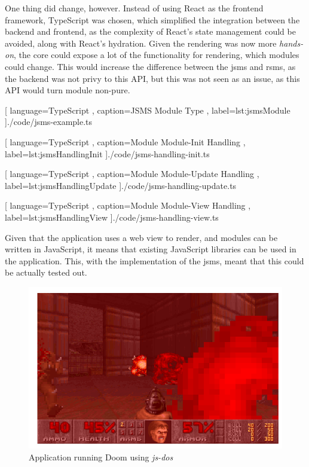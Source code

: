 One thing did change, however. Instead of using React as the frontend framework,
TypeScript was chosen, which simplified the integration between the backend and
frontend, as the complexity of React's state management could be avoided, along
with React's hydration. Given the rendering was now more \textit{hands-on}, the
core could expose a lot of the functionality for rendering, which modules could
change. This would increase the difference between the \gls{jsms} and
\gls{rsms}, as the backend was not privy to this API, but this was not seen as
an issue, as this API would turn module non-pure.

\begin{center}
  
    [ language=TypeScript
    , caption={JSMS Module Type}
    , label=lst:jsmsModule
    ]{./code/jsms-example.ts}
\end{center}

\begin{center}
  
    [ language=TypeScript
    , caption={Module Module-Init Handling}
    , label=lst:jsmsHandlingInit
    ]{./code/jsms-handling-init.ts}
\end{center}

\begin{center}
  
    [ language=TypeScript
    , caption={Module Module-Update Handling}
    , label=lst:jsmsHandlingUpdate
    ]{./code/jsms-handling-update.ts}
\end{center}

\begin{center}
  
    [ language=TypeScript
    , caption={Module Module-View Handling}
    , label=lst:jsmsHandlingView
    ]{./code/jsms-handling-view.ts}
\end{center}

Given that the application uses a web view to render, and modules can be written
in JavaScript, it means that existing JavaScript libraries can be used in the
application. This, with the implementation of the \gls{jsms}, meant that this
could be actually tested out.

\begin{figure}
  \centering
  \includegraphics[scale=0.5]{./pics/doom}
  \caption{Application running Doom using \textit{js-dos}}
  \label{fig:doom}
\end{figure}

